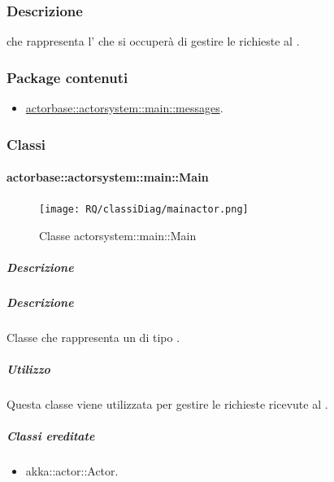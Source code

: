 \documentclass{scalatekids-article}
\begin{document}
\subsubsection{Descrizione}
 che rappresenta l' che si occuperà di gestire le
richieste al .

\subsubsection{Package contenuti}
\begin{itemize}
\item \hyperref[sec:actorbase::actorsystem::main::messages]{actorbase::actorsystem::main::messages}.
\end{itemize}

\subsubsection{Classi}

\paragraph{actorbase::actorsystem::main::Main}
\label{sec:actorbase::actorsystem::main::Main}

\begin{figure}[H]
  \begin{center}
    \texttt{[image: RQ/classiDiag/mainactor.png]}
    \caption{Classe actorsystem::main::Main}
  \end{center}
\end{figure}

\subparagraph{Descrizione}

\subparagraph{Descrizione}
Classe che rappresenta un  di tipo .

\subparagraph{Utilizzo}
Questa classe viene utilizzata per gestire le richieste ricevute al
.

\subparagraph{Classi ereditate}
\begin{itemize}
\item akka::actor::Actor.
\end{itemize}
\end{document}
